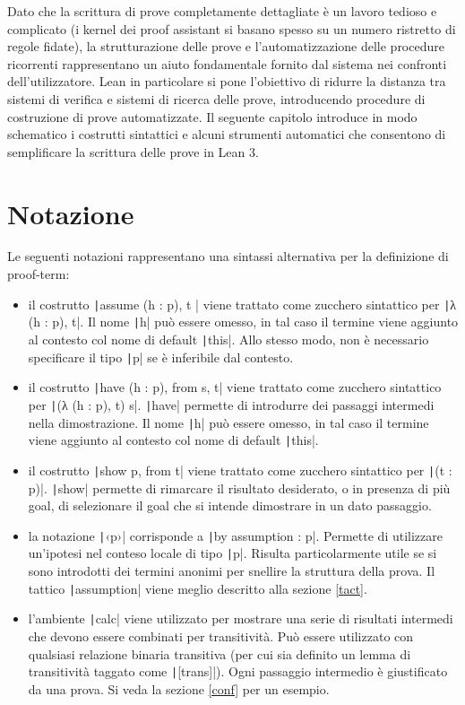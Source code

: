 Dato che la scrittura di prove completamente dettagliate è un lavoro tedioso e complicato (i kernel dei proof assistant si basano spesso su un numero ristretto di regole fidate), la strutturazione delle prove e l'automatizzazione delle procedure ricorrenti rappresentano un aiuto fondamentale fornito dal sistema nei confronti dell'utilizzatore. Lean in particolare si pone l'obiettivo di ridurre la distanza tra sistemi di verifica e sistemi di ricerca delle prove, introducendo procedure di costruzione di prove automatizzate.
Il seguente capitolo introduce in modo schematico i costrutti sintattici e alcuni strumenti automatici che consentono di semplificare la scrittura delle prove in Lean 3.


\section{Notazione} \label{not}
Le seguenti notazioni rappresentano una sintassi alternativa per la definizione di proof-term:
\begin{itemize}
    \item il costrutto \texttt|assume (h : p), t | viene trattato come zucchero sintattico per \texttt|λ (h : p), t|. Il nome \texttt|h| può essere omesso, in tal caso il termine viene aggiunto al contesto col nome di default \texttt|this|. Allo stesso modo, non è necessario specificare il tipo \texttt|p| se è inferibile dal contesto.
    \item il costrutto \texttt|have (h : p), from s, t| viene trattato come zucchero sintattico per \texttt|(λ (h : p), t) s|. \texttt|have| permette di introdurre dei passaggi intermedi nella dimostrazione. Il nome \texttt|h| può essere omesso, in tal caso il termine viene aggiunto al contesto col nome di default \texttt|this|.
    \item il costrutto \texttt|show p, from t| viene trattato come zucchero sintattico per \texttt|(t : p)|. \texttt|show| permette di rimarcare il risultato desiderato, o in presenza di più goal, di selezionare il goal che si intende dimostrare in un dato passaggio.
    \item la notazione \texttt|‹p›| corrisponde a \texttt|by assumption : p|. Permette di utilizzare un'ipotesi nel conteso locale di tipo \texttt|p|. Risulta particolarmente utile se si sono introdotti dei termini anonimi per snellire la struttura della prova. Il tattico \texttt|assumption| viene meglio descritto alla sezione \ref{tact}.
    \item l'ambiente \texttt|calc| viene utilizzato per mostrare una serie di risultati intermedi che devono essere combinati per transitività. Può essere utilizzato con qualsiasi relazione binaria transitiva (per cui sia definito un lemma di transitività taggato come \texttt|[trans]|). Ogni passaggio intermedio è giustificato da una prova. Si veda la sezione \ref{conf} per un esempio.
\end{itemize}
